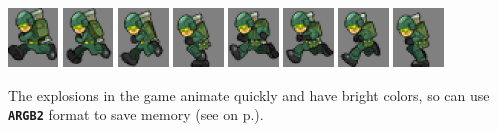\documentclass[10pt]{book}
\newcommand{\mach}[1]{\texttt{\textbf{#1}}}
\newcommand{\xref}[1]{\textit{\nameref{#1}} on  p.\pageref{#1}}
\begin{document}
\begin{center}
\includegraphics[width=0.1\textwidth]{previews/nightstrike_0-SOLDIER_RUN-00.png}
\includegraphics[width=0.1\textwidth]{previews/nightstrike_0-SOLDIER_RUN-01.png}
\includegraphics[width=0.1\textwidth]{previews/nightstrike_0-SOLDIER_RUN-02.png}
\includegraphics[width=0.1\textwidth]{previews/nightstrike_0-SOLDIER_RUN-03.png}
\includegraphics[width=0.1\textwidth]{previews/nightstrike_0-SOLDIER_RUN-04.png}
\includegraphics[width=0.1\textwidth]{previews/nightstrike_0-SOLDIER_RUN-05.png}
\includegraphics[width=0.1\textwidth]{previews/nightstrike_0-SOLDIER_RUN-06.png}
\includegraphics[width=0.1\textwidth]{previews/nightstrike_0-SOLDIER_RUN-07.png}
\end{center}

The explosions in the game animate quickly and have bright colors, so can
use \mach{ARGB2} format to save memory (see \xref{eightbit}).
\end{document}
